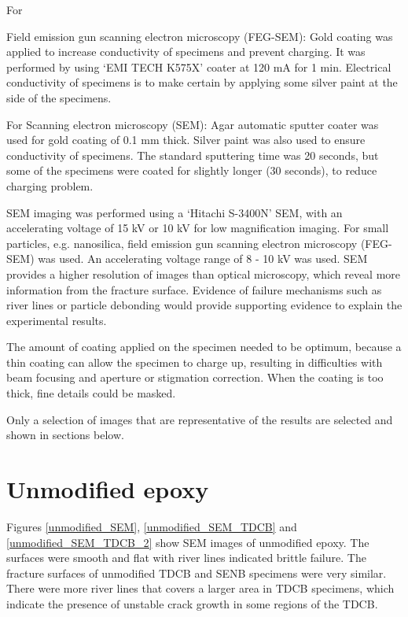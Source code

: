 \documentclass[numbers=noendperiod,chapterprefix=on]{icldt} %
\begin{document}
For {Field emission gun scanning electron microscopy (FEG-SEM):
Gold coating was applied to increase conductivity of specimens and prevent charging. It was performed by using ‘EMI TECH K575X' coater at 120 mA for 1 min. Electrical conductivity of specimens is to make certain by applying some silver paint at the side of the specimens.

For Scanning electron microscopy (SEM):
Agar automatic sputter coater was used for gold coating of 0.1 mm thick. Silver paint was also used to ensure conductivity of specimens. The standard sputtering time was 20 seconds, but some of the specimens were coated for slightly longer (30 seconds), to reduce charging problem.

SEM imaging was performed using a ‘Hitachi S-3400N' SEM, with an accelerating voltage of 15 kV or 10 kV for low magnification imaging. 
For small particles, e.g. nanosilica, field emission gun scanning electron microscopy (FEG-SEM) was used. An  accelerating voltage range of 8 - 10 kV was used.
SEM provides a higher resolution of images than optical microscopy, which reveal more information from the fracture surface. Evidence of failure mechanisms such as river lines or particle debonding would provide supporting evidence to explain the experimental results. 

The amount of coating applied on the specimen needed to be optimum, because a thin coating can allow the specimen to charge up, resulting in difficulties with beam focusing and aperture or stigmation correction. When the coating is too thick, fine details could be masked.

Only a selection of images that are representative of the results are selected and shown in sections below.

\section{Unmodified epoxy}

Figures \ref{unmodified_SEM}, \ref{unmodified_SEM_TDCB} and \ref{unmodified_SEM_TDCB_2} show SEM images of unmodified epoxy. 
The surfaces were smooth and flat with river lines indicated brittle failure. 
The fracture surfaces of unmodified TDCB and SENB specimens were very similar. There were more river lines that covers a larger area in TDCB specimens, which indicate the presence of unstable crack growth in some regions of the TDCB.

}
\end{document}
